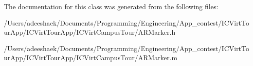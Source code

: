 The documentation for this class was generated from the following files\-:\begin{DoxyCompactItemize}
\item 
/\-Users/adeeshaek/\-Documents/\-Programming/\-Engineering/\-App\-\_\-contest/\-I\-C\-Virt\-Tour\-App/\-I\-C\-Virt\-Tour\-App/\-I\-C\-Virt\-Campus\-Tour/A\-R\-Marker.\-h\item 
/\-Users/adeeshaek/\-Documents/\-Programming/\-Engineering/\-App\-\_\-contest/\-I\-C\-Virt\-Tour\-App/\-I\-C\-Virt\-Tour\-App/\-I\-C\-Virt\-Campus\-Tour/A\-R\-Marker.\-m\end{DoxyCompactItemize}
